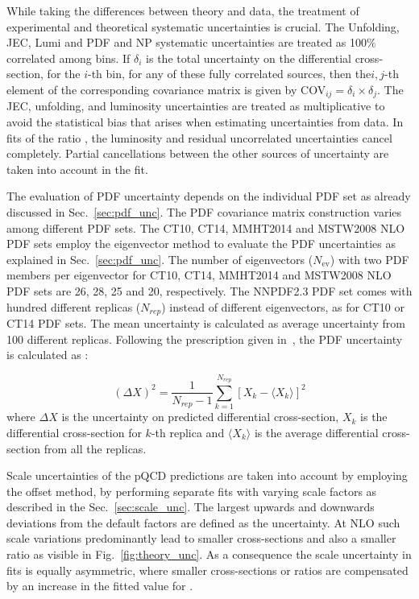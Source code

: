 While taking the differences between theory and data, the treatment of experimental and theoretical systematic uncertainties is crucial. The Unfolding, JEC, Lumi and PDF and NP systematic uncertainties are treated as 100$\%$ correlated among \httwo bins. If $\delta_i$ is the total uncertainty on the differential cross-section, for the $i$-th \httwo bin, for any of these fully correlated sources, then the$i,j$-th element of the corresponding covariance matrix is given by COV$_{ij} = \delta_i \times \delta_j$. The JEC, unfolding, and luminosity uncertainties are treated as multiplicative to avoid the statistical bias that arises when estimating uncertainties from data. In fits of the ratio \ratio, the luminosity and residual uncorrelated uncertainties cancel completely. Partial cancellations between the other sources of uncertainty are taken into account in the fit. 

The evaluation of PDF uncertainty depends on the individual PDF set as already discussed in Sec.~\ref{sec:pdf_unc}. The PDF covariance matrix construction varies among different PDF sets. The CT10, CT14, MMHT2014 and MSTW2008 NLO PDF sets employ the eigenvector method to evaluate the PDF uncertainties as explained in Sec.~\ref{sec:pdf_unc}. The number of eigenvectors ($N_\mathrm{ev}$) with two PDF members per eigenvector for CT10, CT14, MMHT2014 and MSTW2008 NLO PDF sets are 26, 28, 25 and 20, respectively. The NNPDF2.3 PDF set comes with hundred different replicas ($N_{rep}$) instead of different eigenvectors, as for CT10 or CT14 PDF sets. The mean uncertainty is calculated as average uncertainty from 100 different replicas. Following the prescription given in~\cite{Ball:2010de}, the PDF uncertainty is calculated as :

\begin{equation}
(\Delta X)^2 = \frac{1}{N_{rep}-1} \sum_{k=1}^{N_{rep}} [X_k - \langle X_k \rangle]^2
\end{equation}
where $\Delta X$ is the uncertainty on predicted differential cross-section, $X_k$ is the differential cross-section for $k$-th replica and $\langle X_k \rangle$ is the average differential cross-section from all the replicas. 

Scale uncertainties of the pQCD predictions are taken into account by employing the offset method, \ie by performing separate fits with varying scale factors as described in the Sec.~\ref{sec:scale_unc}. The largest upwards and downwards deviations from the default factors are defined as the uncertainty. At NLO such scale variations predominantly lead to smaller cross-sections and also a smaller ratio \ratio as visible in Fig.~\ref{fig:theory_unc}. As a consequence the scale uncertainty in fits is equally asymmetric, where smaller cross-sections or ratios are compensated by an increase in the fitted value for \alpsmz.

